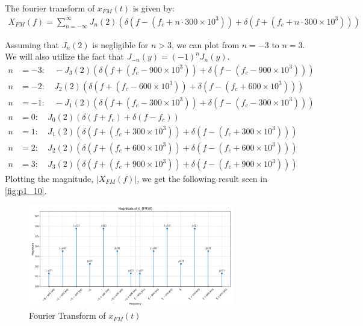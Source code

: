 \documentclass{article}
\begin{document}
\begin{enumerate}[label=1.\arabic*]
    The fourier transform of $x_{FM}(t)$ is given by:
    \begin{align*}
        X_{FM}(f) = \sum_{n=-\infty}^{\infty} J_n(2) \left(
            \delta(f - (f_c + n\cdot 300 \times 10^3)) + \delta(f + (f_c + n\cdot 300 \times 10^3))
        \right)
    \end{align*}

    Assuming that $J_n(2)$ is negligible for $n > 3$, we can plot from $n = -3$ to $n = 3$. We will also utilize the fact that $J_{-n}(y) = (-1)^n J_n(y)$.
    \begin{align*}
        n &= -3: \quad -J_{3}(2)\left(\delta(f + (f_c - 900 \times 10^3)) + \delta(f - (f_c - 900 \times 10^3))\right) \\
        n &= -2: \quad J_{2}(2)\left(\delta(f + (f_c - 600 \times 10^3 )) + \delta(f - (f_c + 600 \times 10^3))\right) \\
        n &= -1: \quad -J_{1}(2)\left(\delta(f + (f_c - 300 \times 10^3 )) + \delta(f - (f_c - 300 \times 10^3))\right) \\
        n &= 0: \quad J_{0}(2)\left(\delta(f + f_c) + \delta(f - f_c)\right) \\
        n &= 1: \quad J_{1}(2)\left(\delta(f + (f_c + 300 \times 10^3 )) + \delta(f - (f_c + 300 \times 10^3))\right) \\
        n &= 2: \quad J_{2}(2)\left(\delta(f + (f_c + 600 \times 10^3 )) + \delta(f - (f_c + 600 \times 10^3))\right) \\
        n &= 3: \quad J_{3}(2)\left(\delta(f + (f_c + 900 \times 10^3 )) + \delta(f - (f_c + 900 \times 10^3))\right)
    \end{align*}
    \newpage
    Plotting the magnitude, $|X_{FM}(f)|$, we get the following result seen in \autoref{fig:p1_10}.
    \begin{figure}[ht!]
        \centering
        \includegraphics[width=0.8\textwidth]{X_FM.png}
        \caption{Fourier Transform of $x_{FM}(t)$}
        \label{fig:p1_10}
    \end{figure}


\end{enumerate}
\end{document}
